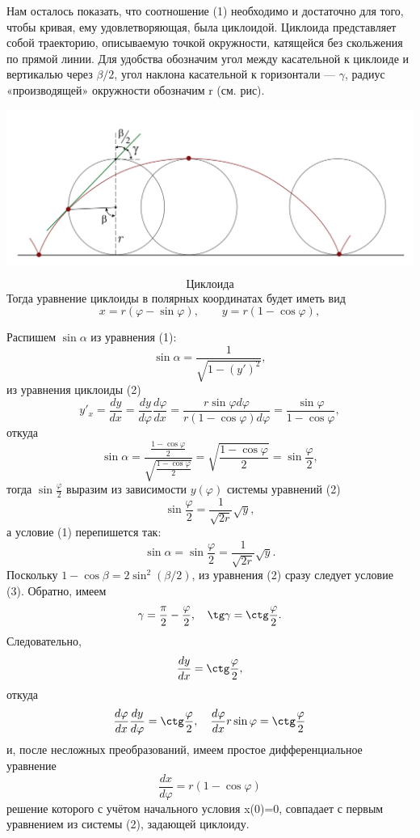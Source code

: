 \documentclass[a4paper, 12pt]{article}
\begin{document}
Нам осталось показать, что соотношение (1) необходимо и достаточно для того, чтобы кривая, ему удовлетворяющая, была циклоидой. Циклоида представляет собой траекторию, описываемую точкой окружности, катящейся без скольжения по прямой линии. Для удобства обозначим угол между касательной к циклоиде и вертикалью через $\beta / 2$, угол наклона касательной к горизонтали — $\gamma$, радиус «производящей» окружности обозначим r (см. рис).
\begin{center}
\includegraphics[scale=0.5]{cycloida}
\end{center}
\[\textit{Циклоида}\]
Тогда уравнение циклоиды в полярных координатах будет иметь вид
\begin{equation}
x = r(\varphi - \sin\varphi),\text{ }\text{ }\text{ } y = r(1 - \cos\varphi),
\end{equation}

Распишем $\sin\alpha$ из уравнения (1):
\[\sin\alpha = \frac{1}{\sqrt{1 - (y')^2}},\]
из уравнения циклоиды (2)
\[y'_x = \frac{dy}{dx} = \frac{dy}{d\varphi}\frac{d\varphi}{dx} = \frac{r\sin\varphi d\varphi}{r(1 - \cos\varphi)d\varphi} = \frac{\sin\varphi}{1 - \cos\varphi},\]
откуда
\[\sin\alpha = \frac{\frac{1 - \cos\varphi}{2}}{\sqrt{\frac{1 - \cos\varphi}{2}}} = \sqrt{\frac{1 - \cos\varphi}{2}} = \sin\frac{\varphi}{2},\]
тогда $\sin\frac{\varphi}{2}$ выразим из зависимости $y(\varphi)$ системы уравнений (2)
\[\sin\frac{\varphi}{2} = \frac{1}{\sqrt{2r}} \sqrt{y},\]
а условие (1) перепишется так: \\
\begin{equation}
\sin\alpha = \sin\frac{\varphi}{2} = \frac{1}{\sqrt{2r}} \sqrt{y} .
\end{equation}
Поскольку $1 - \cos\beta = 2\sin^2 (\beta /2)$, из уравнения (2) сразу следует условие (3). Обратно, имеем 
\[\gamma = \frac{\pi}{2} - \frac{\varphi}{2}, \text{ }\text{ }\text{ } \tg\gamma = \ctg\frac{\varphi}{2}.\]
Следовательно, 
\[\frac{dy}{dx} = \ctg\frac{\varphi}{2},\]
откуда 
\[\frac{d\varphi}{dx}\frac{dy}{d\varphi} = \ctg\frac{\varphi}{2}, \text{ }\text{ }\text{ }\frac{d\varphi}{dx}r\sin\varphi = \ctg\frac{\varphi}{2}\]
и, после несложных преобразований, имеем простое дифференциальное уравнение 
\[\frac{dx}{d\varphi} = r(1 - \cos\varphi)\]
решение которого с учётом начального условия x(0)=0, совпадает с первым уравнением из системы (2), задающей циклоиду. 
\newpage
\end{document}
